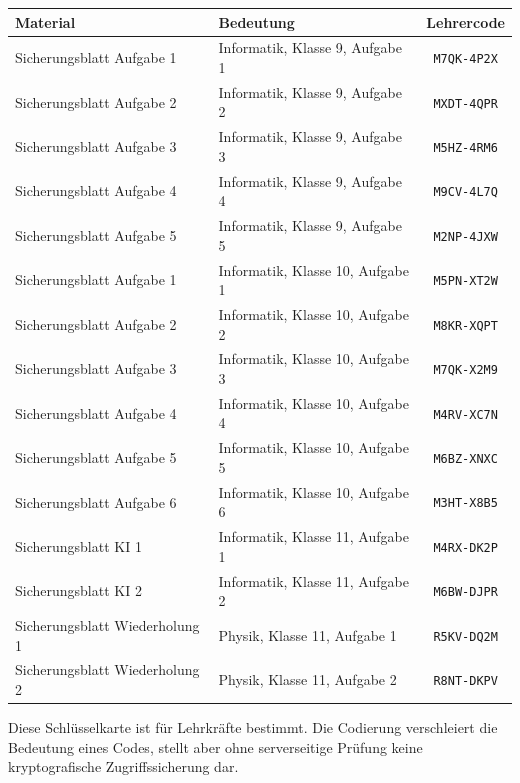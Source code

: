 \documentclass[10pt,a4paper]{article}
\begin{document}
\begin{center}
\begin{tabular}{l l c}
\toprule
Material & Bedeutung & Lehrercode \\
\midrule
Sicherungsblatt Aufgabe 1 & Informatik, Klasse 9, Aufgabe 1 &
\texttt{M7QK-4P2X} \\
Sicherungsblatt Aufgabe 2 & Informatik, Klasse 9, Aufgabe 2 &
\texttt{MXDT-4QPR} \\
Sicherungsblatt Aufgabe 3 & Informatik, Klasse 9, Aufgabe 3 &
\texttt{M5HZ-4RM6} \\
Sicherungsblatt Aufgabe 4 & Informatik, Klasse 9, Aufgabe 4 &
\texttt{M9CV-4L7Q} \\
Sicherungsblatt Aufgabe 5 & Informatik, Klasse 9, Aufgabe 5 &
\texttt{M2NP-4JXW} \\
Sicherungsblatt Aufgabe 1 & Informatik, Klasse 10, Aufgabe 1 &
\texttt{M5PN-XT2W} \\
Sicherungsblatt Aufgabe 2 & Informatik, Klasse 10, Aufgabe 2 &
\texttt{M8KR-XQPT} \\
Sicherungsblatt Aufgabe 3 & Informatik, Klasse 10, Aufgabe 3 &
\texttt{M7QK-X2M9} \\
Sicherungsblatt Aufgabe 4 & Informatik, Klasse 10, Aufgabe 4 &
\texttt{M4RV-XC7N} \\
Sicherungsblatt Aufgabe 5 & Informatik, Klasse 10, Aufgabe 5 &
\texttt{M6BZ-XNXC} \\
Sicherungsblatt Aufgabe 6 & Informatik, Klasse 10, Aufgabe 6 &
\texttt{M3HT-X8B5} \\
Sicherungsblatt KI 1 & Informatik, Klasse 11, Aufgabe 1 &
\texttt{M4RX-DK2P} \\
Sicherungsblatt KI 2 & Informatik, Klasse 11, Aufgabe 2 &
\texttt{M6BW-DJPR} \\
Sicherungsblatt Wiederholung 1 & Physik, Klasse 11, Aufgabe 1 &
\texttt{R5KV-DQ2M} \\
Sicherungsblatt Wiederholung 2 & Physik, Klasse 11, Aufgabe 2 &
\texttt{R8NT-DKPV} \\
\bottomrule
\end{tabular}
\end{center}

\vfill
\textcolor{Muted}{\small
Diese Schlüsselkarte ist für Lehrkräfte bestimmt. Die Codierung verschleiert
die Bedeutung eines Codes, stellt aber ohne serverseitige Prüfung keine
kryptografische Zugriffssicherung dar.}
\end{document}
